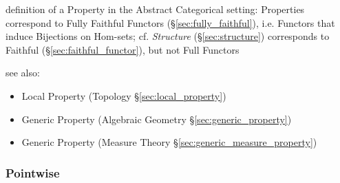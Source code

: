 definition of a Property in the Abstract Categorical setting: Properties
correspond to Fully Faithful Functors (\S\ref{sec:fully_faithful}), i.e.
Functors that induce Bijections on Hom-sets; cf. \emph{Structure}
(\S\ref{sec:structure}) corresponds to Faithful (\S\ref{sec:faithful_functor}),
but not Full Functors

see also:
\begin{itemize}
  \item Local Property (Topology \S\ref{sec:local_property})
  \item Generic Property (Algebraic Geometry \S\ref{sec:generic_property})
  \item Generic Property (Measure Theory \S\ref{sec:generic_measure_property})
\end{itemize}



\subsubsection{Pointwise}\label{sec:pointwise}
